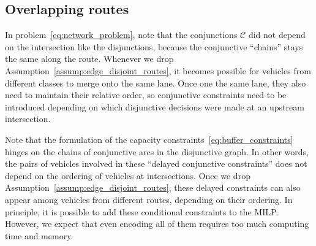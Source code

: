 \documentclass[a4paper]{article}
\theoremstyle{definition}
\theoremstyle{plain}
\begin{document}
%

\subsection*{Overlapping routes}

In problem~\ref{eq:network_problem}, note that the conjunctions $\mathcal{C}$
did not depend on the intersection like the disjunctions, because the
conjunctive ``chains'' stays the same along the route. Whenever we drop
Assumption~\ref{assump:edge_disjoint_routes}, it becomes possible for vehicles from different
classes to merge onto the same lane. Once one the same lane, they also need to
maintain their relative order, so conjunctive constraints need to be introduced
depending on which disjunctive decisions were made at an upstream intersection.

Note that the formulation of the capacity constraints~\eqref{eq:buffer_constraints} hinges on the chains
of conjunctive arcs in the disjunctive graph. In other words, the pairs of
vehicles involved in these ``delayed conjunctive constraints'' does not depend
on the ordering of vehicles at intersections. Once we drop Assumption~\ref{assump:edge_disjoint_routes}, these
delayed constraints can also appear among vehicles from different routes,
depending on their ordering. In principle, it is possible to add these
conditional constraints to the MILP. However, we expect that even encoding all
of them requires too much computing time and memory.
\end{document}

